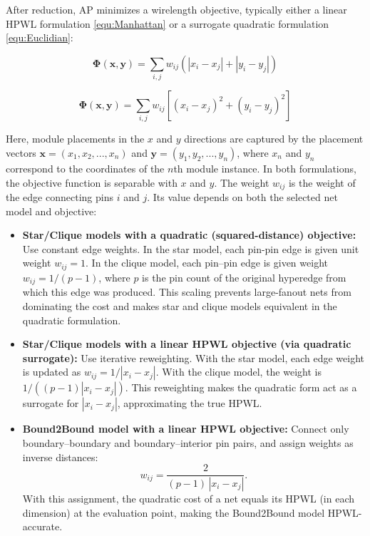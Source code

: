 After reduction, AP minimizes a wirelength objective, typically either a linear HPWL formulation \eqref{equ:Manhattan} or a surrogate quadratic formulation \eqref{equ:Euclidian}:

\begin{equation}
    \boldsymbol{\Phi} (\boldsymbol{x}, \boldsymbol{y}) = \sum_{i,j} w_{ij} \left( |x_i - x_j| + |y_i - y_j| \right)
    \label{equ:Manhattan}
\end{equation}

\begin{equation}
    \boldsymbol{\Phi} (\boldsymbol{x}, \boldsymbol{y}) = \sum_{i,j} w_{ij} \left[ (x_i - x_j)^2 + (y_i - y_j)^2 \right]
    \label{equ:Euclidian}
\end{equation}


Here, module placements in the $x$ and $y$ directions are captured by the placement vectors \( \boldsymbol{x} = (x_1, x_2, ..., x_n) \) and \( \boldsymbol{y} = (y_1, y_2, ..., y_n) \), where $x_n$ and $y_n$ correspond to the coordinates of the $n$th module instance.
In both formulations, the objective function is separable with $x$ and $y$.
The weight \(w_{ij}\) is the weight of the edge connecting pins $i$ and $j$. 
Its value depends on both the selected net model and objective:

\begin{itemize}
    \item \textbf{Star/Clique models with a quadratic (squared-distance) objective:}  
    Use constant edge weights. In the star model, each pin-pin edge is given unit weight $w_{ij}=1$.  
    In the clique model, each pin–pin edge is given weight $w_{ij}=1/(p-1)$, where $p$ is the pin count of the original hyperedge from which this edge was produced.  
    This scaling prevents large-fanout nets from dominating the cost and makes star and clique models equivalent in the quadratic formulation.

    \item \textbf{Star/Clique models with a linear HPWL objective (via quadratic surrogate):}  
    Use iterative reweighting. With the star model, each edge weight is updated as $w_{ij}=1/|x_i-x_j|$. With the clique model, the weight is $1/((p-1)|x_i-x_j|)$.  
    This reweighting makes the quadratic form act as a surrogate for $|x_i-x_j|$, approximating the true HPWL.

    \item \textbf{Bound2Bound model with a linear HPWL objective:}  
    Connect only boundary–boundary and boundary–interior pin pairs, and assign weights as inverse distances:  
    \begin{equation}
        w_{ij} = \frac{2}{(p-1)\,|x_i - x_j|}.
        \label{equ:weight_linearized}
    \end{equation}
    With this assignment, the quadratic cost of a net equals its HPWL (in each dimension) at the evaluation point, making the Bound2Bound model HPWL-accurate.
\end{itemize}

